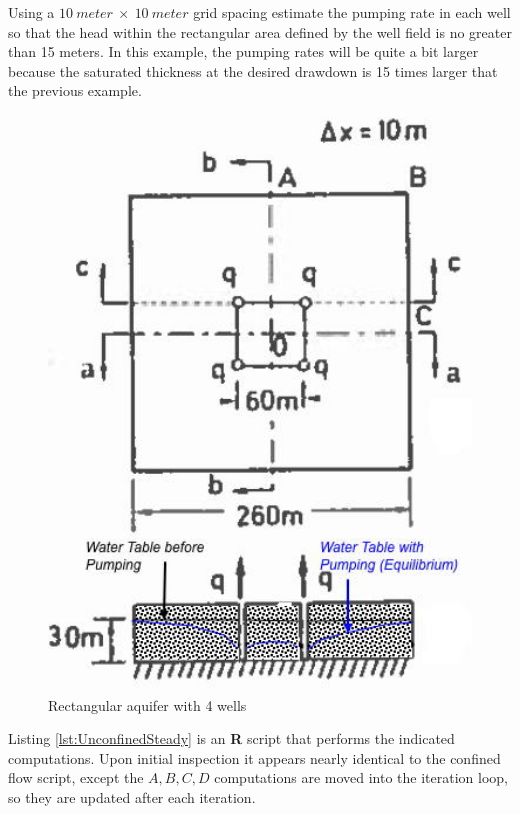 Using a $10~meter~\times~10~meter$ grid spacing estimate the pumping rate in each well so that the head within the rectangular area defined by the well field is no greater than 15 meters.
In this example, the pumping rates will be quite a bit larger because the saturated thickness at the desired drawdown is 15 times larger that the previous example.
\begin{figure}[h!] %
   \centering
   \includegraphics[height=6in]{./17-SteadyGroundwaterFlow/4WellsSteadyUnconfined.jpg} 
   \caption{Rectangular aquifer with 4 wells}
   \label{fig:4WellsSteadyUnconfined}
\end{figure}

Listing \ref{lst:UnconfinedSteady} is an \textbf{R} script that performs the indicated computations. 
Upon initial inspection it appears nearly identical to the confined flow script, except the $A,B,C,D$ computations are moved into the iteration loop, so they are updated after each iteration.  

